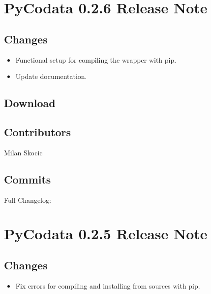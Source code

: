 \documentclass[a4paper,10pt,english]{sphinxmanual}
\begin{document}
\section{PyCodata 0.2.6 Release Note}
\label{\detokenize{releases/0.2.6-notes:pycodata-0-2-6-release-note}}\label{\detokenize{releases/0.2.6-notes::doc}}

\subsection{Changes}
\label{\detokenize{releases/0.2.6-notes:changes}}\begin{itemize}
\item {} 
\sphinxAtStartPar
Functional setup for compiling the wrapper with pip.

\item {} 
\sphinxAtStartPar
Update documentation.

\end{itemize}


\subsection{Download}
\label{\detokenize{releases/0.2.6-notes:download}}
\sphinxAtStartPar
{}


\subsection{Contributors}
\label{\detokenize{releases/0.2.6-notes:contributors}}
\sphinxAtStartPar
Milan Skocic


\subsection{Commits}
\label{\detokenize{releases/0.2.6-notes:commits}}
\sphinxAtStartPar
Full Changelog: 

\sphinxstepscope


\section{PyCodata 0.2.5 Release Note}
\label{\detokenize{releases/0.2.5-notes:pycodata-0-2-5-release-note}}\label{\detokenize{releases/0.2.5-notes::doc}}

\subsection{Changes}
\label{\detokenize{releases/0.2.5-notes:changes}}\begin{itemize}
\item {} 
\sphinxAtStartPar
Fix errors for compiling and installing from sources with pip.

\end{itemize}
\end{document}
